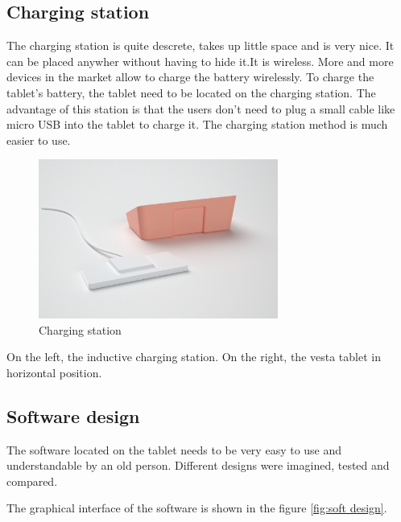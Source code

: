 \subsection{Charging station}
The charging station is quite descrete, takes up little space and is very nice. It can be placed anywher without having to hide it.It is wireless. More and more devices in the market allow to charge the battery wirelessly. To charge the tablet's battery, the tablet need to be located on the charging station. The advantage of this station is that the users don't need to plug a small cable like micro USB into the tablet to charge it. The charging station method is much easier to use.

\begin{figure}
    \centering
    \includegraphics[width=0.7\textwidth,keepaspectratio]{chap/designFig/VisioRender7.png}
    \caption{Charging station}
    \label{fig:charging station}
\end{figure}

On the left, the inductive charging station. On the right, the vesta tablet in horizontal position.

\clearpage

\subsection{Software design}

The software located on the tablet needs to be very easy to use and understandable by an old person. Different designs were imagined, tested and compared.

The graphical interface of the software is shown in the figure \ref{fig:soft design}.

